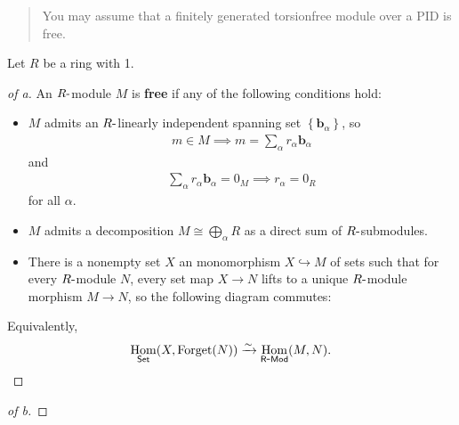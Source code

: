 \begin{quote}
You may assume that a finitely generated torsionfree module over a PID
is free.
\end{quote}

\begin{solution}

Let \(R\) be a ring with 1.

\begin{proof}[of a]

An \(R{\hbox{-}}\)module \(M\) is \textbf{free} if any of the following
conditions hold:

\begin{itemize}
\tightlist
\item
  \(M\) admits an \(R{\hbox{-}}\)linearly independent spanning set
  \(\left\{{\mathbf{b}_\alpha}\right\}\), so
  \begin{align*}m\in M \implies m = \sum_\alpha r_\alpha \mathbf{b}_\alpha\end{align*}
  and
  \begin{align*}\sum_\alpha r_\alpha \mathbf{b}_\alpha = 0_M \implies r_\alpha = 0_R\end{align*}
  for all \(\alpha\).
\item
  \(M\) admits a decomposition \(M \cong \bigoplus_{\alpha} R\) as a
  direct sum of \(R{\hbox{-}}\)submodules.
\item
  There is a nonempty set \(X\) an monomorphism \(X\hookrightarrow M\)
  of sets such that for every \(R{\hbox{-}}\)module \(N\), every set map
  \(X\to N\) lifts to a unique \(R{\hbox{-}}\)module morphism
  \(M\to N\), so the following diagram commutes:
\end{itemize}

\begin{center}
\end{center}

Equivalently,
\begin{align*}
\mathop{\mathrm{Hom}}_{\mathsf{Set}}(X, {\operatorname{Forget}}(N)) \xrightarrow{\sim} \mathop{\mathrm{Hom}}_{{\mathsf{R}{\hbox{-}}\mathsf{Mod}}}(M, N)
.\end{align*}

\end{proof}

\begin{proof}[of b]


\end{proof}
\end{solution}
